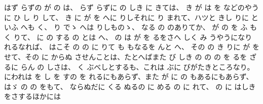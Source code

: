 はず
らずの
が
の
は、
らず
らずに
の
しき
に
きては、
き
が
は
を
などのやうに
ひ
し
り
して、
き
に
が
を
へに
りしそれに
り
まれて、ハツと
きし
りに
といふ
へも
く、
り
でゝ
へは
りしものゝ、
なる
の
のありてか、
が
の
を
ふ
も
く
りて、
に
の
する
の
とは
へ、
の
は
が
を
るをさへ
しく
み
うやうになり
れるなれば、
はこそ
の
の
に
りて
も
もなるを
んと
へ、
その
の
き
りに
が
を
せて、その
に
からぬ
させんことは、たとへばまた
び
しき
の
の
の
を
るを
ざるに
らん
の
しさは、
く
ぶべしとするも、これは
ぶに
びがたきところなり。
にわれは
を
し
を
すの
を
れるにもあらず、また
が
に
の
もあるにもあらず、
はゞ
の
の
をもて、
ならぬだに
くる
ぬるの
に
める
の
に
れて、
の
に
はしき
をさするほかには
